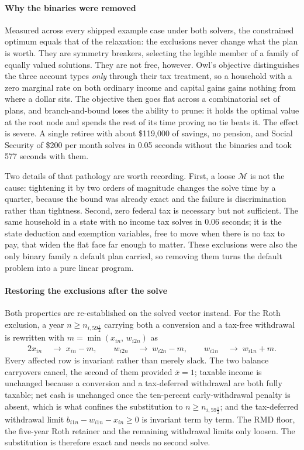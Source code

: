 \documentclass[fleqn,12pt]{report}
\begin{document}
	\paragraph*{Why the binaries were removed}
	Measured across every shipped example case under both solvers, the constrained optimum
	equals that of the relaxation: the exclusions never change what the plan is worth. They
	are symmetry breakers, selecting the legible member of a family of equally valued
	solutions. They are not free, however. Owl's objective distinguishes the three account
	types \emph{only} through their tax treatment, so a household with a zero marginal rate
	on both ordinary income and capital gains gains nothing from where a dollar sits. The
	objective then goes flat across a combinatorial set of plans, and branch-and-bound loses
	the ability to prune: it holds the optimal value at the root node and spends the rest of
	its time proving no tie beats it. The effect is severe. A single retiree with about
	\$119{,}000 of savings, no pension, and Social Security of \$200 per month solves in
	0.05 seconds without the binaries and took 577 seconds with them.

	Two details of that pathology are worth recording. First, a loose $\mathcal{M}$ is not
	the cause: tightening it by two orders of magnitude changes the solve time by a quarter,
	because the bound was already exact and the failure is discrimination rather than
	tightness. Second, zero federal tax is necessary but not sufficient. The same household
	in a state with no income tax solves in 0.06 seconds; it is the state deduction and
	exemption variables, free to move when there is no tax to pay, that widen the flat face
	far enough to matter. These exclusions were also the only binary family a default plan
	carried, so removing them turns the default problem into a pure linear program.

	\paragraph*{Restoring the exclusions after the solve}
	Both properties are re-established on the solved vector instead. For the Roth exclusion,
	a year $n \ge n_{i,59\frac{1}{2}}$ carrying both a conversion and a tax-free withdrawal
	is rewritten with $m = \min(x_{in},\, w_{i2n})$ as
	\begin{alignat}{2}
		\label{Eq:Binary2}
		x_{in} &\;\rightarrow\; x_{in} - m, \qquad
		w_{i2n} &\;\rightarrow\; w_{i2n} - m, \qquad
		w_{i1n} &\;\rightarrow\; w_{i1n} + m.
	\end{alignat}
	Every affected row is invariant rather than merely slack. The two balance carryovers
	cancel, the second of them provided $\bar{x} = 1$; taxable income is unchanged because a
	conversion and a tax-deferred withdrawal are both fully taxable; net cash is unchanged
	once the ten-percent early-withdrawal penalty is absent, which is what confines the
	substitution to $n \ge n_{i,59\frac{1}{2}}$; and the tax-deferred withdrawal limit
	$b_{i1n} - w_{i1n} - x_{in} \ge 0$ is invariant term by term. The RMD floor, the five-year
	Roth retainer and the remaining withdrawal limits only loosen. The substitution is
	therefore exact and needs no second solve.
\end{document}
